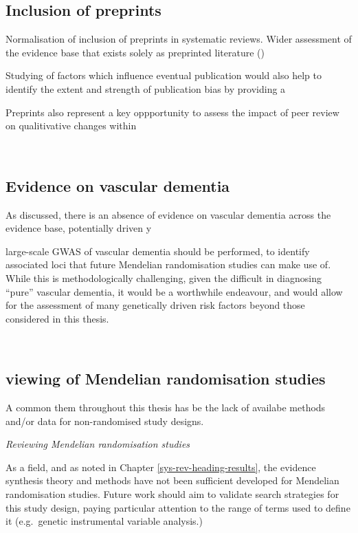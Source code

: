 \documentclass[a4paper, twoside]{templates/ociamthesis}
\begin{document}
\hypertarget{inclusion-of-preprints-1}{%
\subsection{Inclusion of preprints}\label{inclusion-of-preprints-1}}

Normalisation of inclusion of preprints in systematic reviews. Wider assessment of the evidence base that exists solely as preprinted literature ()

Studying of factors which influence eventual publication would also help to identify the extent and strength of publication bias by providing a

Preprints also represent a key oppportunity to assess the impact of peer review on qualitivative changes within

~

\hypertarget{evidence-on-vascular-dementia}{%
\subsection{Evidence on vascular dementia}\label{evidence-on-vascular-dementia}}

As discussed, there is an absence of evidence on vascular dementia across the evidence base, potentially driven y

large-scale GWAS of vascular dementia should be performed, to identify associated loci that future Mendelian randomisation studies can make use of. While this is methodologically challenging, given the difficult in diagnosing ``pure'' vascular dementia, it would be a worthwhile endeavour, and would allow for the assessment of many genetically driven risk factors beyond those considered in this thesis.

~

\hypertarget{viewing-of-mendelian-randomisation-studies}{%
\subsection{viewing of Mendelian randomisation studies}\label{viewing-of-mendelian-randomisation-studies}}

A common them throughout this thesis has be the lack of availabe methods and/or data for non-randomised study designs.

\emph{Reviewing Mendelian randomisation studies}

As a field, and as noted in Chapter \ref{sys-rev-heading-results}, the evidence synthesis theory and methods have not been sufficient developed for Mendelian randomisation studies. Future work should aim to validate search strategies for this study design, paying particular attention to the range of terms used to define it (e.g.~genetic instrumental variable analysis.)
\end{document}
